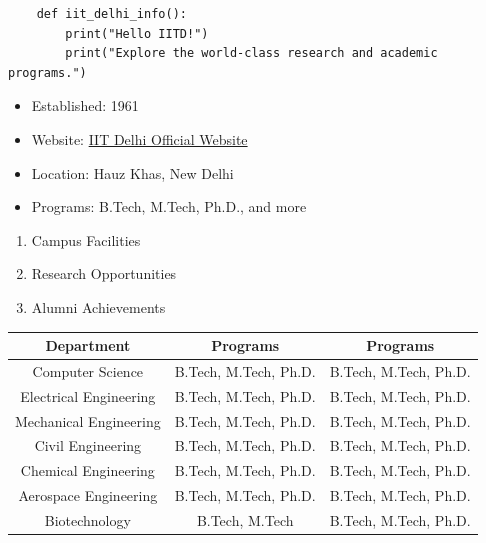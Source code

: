 \documentclass{article}
\begin{document}
\begin{verbatim}
    def iit_delhi_info():
        print("Hello IITD!")
        print("Explore the world-class research and academic programs.")
\end{verbatim}


\begin{itemize}
    \item Established: 1961
    \item Website: \href{https://www.iitd.ac.in}{IIT Delhi Official Website}
    \item Location: Hauz Khas, New Delhi
    \item Programs: B.Tech, M.Tech, Ph.D., and more
\end{itemize}

\begin{enumerate}
    \item Campus Facilities
    \item Research Opportunities
    \item Alumni Achievements
\end{enumerate}



\begin{tabular}{|c|c|c|}
    \hline
    Department & Programs & Programs \\
    \hline
    Computer Science & B.Tech, M.Tech, Ph.D. & B.Tech, M.Tech, Ph.D. \\
    Electrical Engineering & B.Tech, M.Tech, Ph.D. & B.Tech, M.Tech, Ph.D. \\
    Mechanical Engineering & B.Tech, M.Tech, Ph.D. & B.Tech, M.Tech, Ph.D. \\
    Civil Engineering & B.Tech, M.Tech, Ph.D. & B.Tech, M.Tech, Ph.D. \\
    Chemical Engineering & B.Tech, M.Tech, Ph.D. & B.Tech, M.Tech, Ph.D. \\
    Aerospace Engineering & B.Tech, M.Tech, Ph.D. & B.Tech, M.Tech, Ph.D. \\
    Biotechnology & B.Tech, M.Tech & B.Tech, M.Tech, Ph.D. \\
    \hline
\end{tabular}
\end{document}
